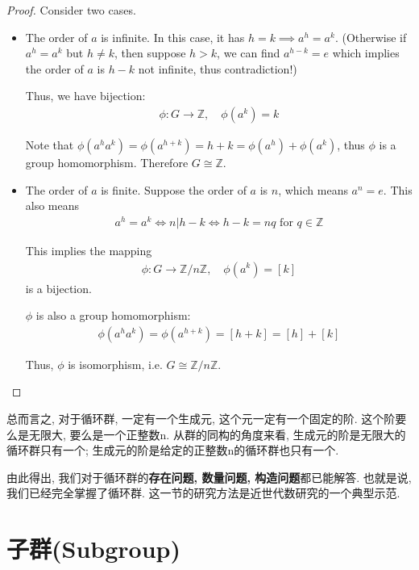 \documentclass[utf8]{ctexbook}
\theoremstyle{definition}
\begin{document}
\begin{proof}
Consider two cases.
\begin{itemize}
\item{The order of $a$ is infinite. In this case, it has $h = k \implies a^h = a^k$. (Otherwise if $a^h = a^k $ but $ h \neq k$, then suppose $h > k$, we can find $a^{h-k} = e $ which implies the order of $a$ is $h-k$ not infinite, thus contradiction!)

Thus, we have bijection:
\begin{align*}
\phi: G \longrightarrow \mathbb{ Z}, \quad \phi(a^k) = k
\end{align*}

Note that $\phi(a^{h} a^{k} ) = \phi(a^{h+k}) =  h+k = \phi(a^h) + \phi(a^k) $, thus $\phi$ is a group homomorphism. Therefore $G \cong \mathbb{Z}$.

}
\item{The order of $a$ is finite. Suppose the order of $a$ is $n$, which means $a^n = e$. This also means
\begin{align*}
a^h = a^k \iff n | h-k \iff h - k = n q \mbox{ for } q \in \mathbb{Z}
\end{align*}

This implies the mapping
\begin{align*}
\phi : G \longrightarrow  \mathbb{Z}/n\mathbb{Z}, \quad  \phi( a^k) =[k]
\end{align*}
is a bijection.

$\phi$ is also a group homomorphism: 
\begin{align*}
\phi( a^h a^k ) = \phi(a^{h+k}) =[h+k] = [h] + [k]
\end{align*}

Thus, $\phi$ is isomorphism, i.e. $G \cong \mathbb{Z}/ n \mathbb{Z}$.
}
\end{itemize}

\end{proof}

总而言之, 对于循环群, 一定有一个生成元, 这个元一定有一个固定的阶. 这个阶要么是无限大, 要么是一个正整数n. 从群的同构的角度来看, 生成元的阶是无限大的循环群只有一个; 生成元的阶是给定的正整数n的循环群也只有一个.

由此得出, 我们对于循环群的\textbf{存在问题, 数量问题, 构造问题}都已能解答. 也就是说, 我们已经完全掌握了循环群. 这一节的研究方法是近世代数研究的一个典型示范.

\section{子群(Subgroup)}
\end{document}
